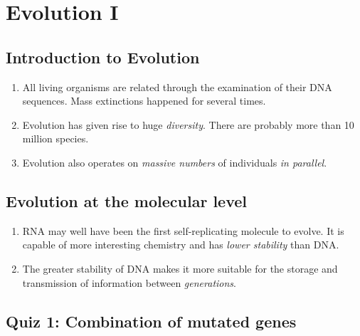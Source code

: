 \chapter{Evolution I}

\section{Introduction to Evolution}

\begin{enumerate}
    \item All living organisms are related through the examination of their DNA sequences. Mass extinctions happened for several times.
    \item Evolution has given rise to huge \textit{diversity}. There are probably more than 10 million species.
    \item Evolution also operates on \textit{massive numbers} of individuals \textit{in parallel}.
\end{enumerate}



\section{Evolution at the molecular level}

\begin{enumerate}
    \item RNA may well have been the first self-replicating molecule to evolve. It is capable of more interesting chemistry and has \textit{lower stability} than DNA.
    \item The greater stability of DNA makes it more suitable for the storage and transmission of information between \textit{generations}.
\end{enumerate}



\section{Quiz 1: Combination of mutated genes}

